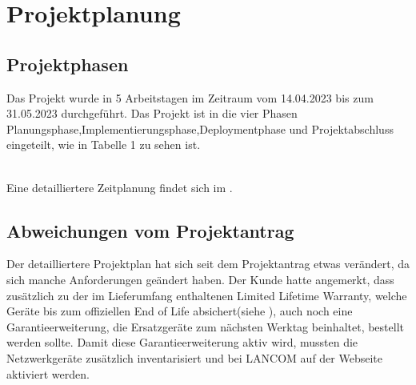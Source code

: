 \section{Projektplanung} 
\label{sec:Projektplanung}


\subsection{Projektphasen}
\label{sec:Projektphasen}

Das Projekt wurde in 5 Arbeitstagen im Zeitraum vom 14.04.2023 bis zum 31.05.2023 durchgeführt. Das Projekt ist in die vier Phasen \glqq Planungsphase\grqq{},\glqq Implementierungsphase\grqq{},\glqq Deploymentphase\grqq{} und \glqq Projektabschluss\grqq{} eingeteilt, wie in Tabelle 1 zu sehen ist.
\begin{comment}

	\item Verfeinerung der Zeitplanung, die bereits im Projektantrag vorgestellt wurde.
\paragraph{Beispiel}
Tabelle~\ref{tab:Zeitplanung} zeigt ein Beispiel für eine grobe Zeitplanung.
\end{comment}
\\
Eine detailliertere Zeitplanung findet sich im .


\subsection{Abweichungen vom Projektantrag}
\label{sec:AbweichungenProjektantrag}
Der detailliertere Projektplan hat sich seit dem Projektantrag etwas verändert, da sich manche Anforderungen geändert haben. Der Kunde hatte angemerkt, dass zusätzlich zu der im Lieferumfang enthaltenen \glqq Limited Lifetime Warranty\grqq{}, welche Geräte bis zum offiziellen \glqq End of Life\grqq{} absichert(siehe \citet{LLW}), auch noch eine Garantieerweiterung, die Ersatzgeräte zum nächsten Werktag beinhaltet, bestellt werden sollte. Damit diese Garantieerweiterung aktiv wird, mussten die Netzwerkgeräte zusätzlich inventarisiert und bei LANCOM auf der Webseite aktiviert werden.
\begin{comment}
	\item Sollte es Abweichungen zum Projektantrag geben (\zB Zeitplanung, Inhalt des Projekts, neue Anforderungen), müssen diese explizit aufgeführt und begründet werden.
\end{comment}


